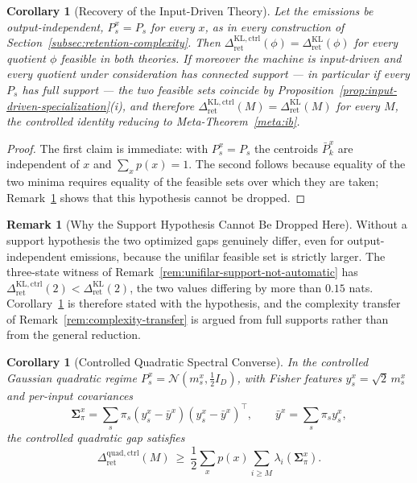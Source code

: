 \documentclass[12pt]{article}
\newtheorem{corollary}[theorem]{Corollary}
\theoremstyle{definition}
\newtheorem{remark}[theorem]{Remark}
\newcommand{\RetKL}{\Delta_{\mathrm{ret}}^{\mathrm{KL}}}
\newcommand{\RetKLc}{\Delta_{\mathrm{ret}}^{\mathrm{KL,ctrl}}}
\newcommand{\RetQuadc}{\Delta_{\mathrm{ret}}^{\mathrm{quad,ctrl}}}
\begin{document}
\begin{corollary}[Recovery of the Input-Driven Theory]
\label{cor:controlled-reduces}
Let the emissions be output-independent, $P_s^x=P_s$ for every $x$, as in every
construction of Section~\ref{subsec:retention-complexity}.  Then
$\RetKLc(\phi)=\RetKL(\phi)$ for every quotient $\phi$ feasible
in both theories.  If moreover the machine is input-driven and every quotient
under consideration has connected support --- in particular if every $P_s$ has
full support --- the two feasible sets coincide by
Proposition~\ref{prop:input-driven-specialization}(i), and therefore
$\RetKLc(M)=\RetKL(M)$ for every $M$, the controlled identity
reducing to Meta-Theorem~\ref{meta:ib}.
\end{corollary}

\begin{proof}
The first claim is immediate: with $P_s^x=P_s$ the centroids $\bar P_k^x$ are
independent of $x$ and $\sum_xp(x)=1$.  The second follows because equality of
the two minima requires equality of the feasible sets over which they are
taken; Remark~\ref{rem:controlled-reduces-sharp} shows that this hypothesis
cannot be dropped.
\end{proof}

\begin{remark}[Why the Support Hypothesis Cannot Be Dropped Here]
\label{rem:controlled-reduces-sharp}
Without a support hypothesis the two optimized gaps genuinely differ, even for
output-independent emissions, because the unifilar feasible set is strictly
larger.  The three-state witness of
Remark~\ref{rem:unifilar-support-not-automatic} has
$\RetKLc(2)<\RetKL(2)$, the two values differing by more than
$0.15$ nats.  Corollary~\ref{cor:controlled-reduces} is therefore stated with
the hypothesis, and the complexity transfer of
Remark~\ref{rem:complexity-transfer} is argued from full supports rather than
from the general reduction.
\end{remark}

\begin{corollary}[Controlled Quadratic Spectral Converse]
\label{cor:controlled-quad-spectral}
In the controlled Gaussian quadratic regime $P_s^x=\mathcal N(m_s^x,\tfrac12I_D)$,
with Fisher features $y_s^x=\sqrt2\,m_s^x$ and per-input covariances
\[
\bm{\Sigma}_\pi^x=\sum_s\pi_s(y_s^x-\bar y^x)(y_s^x-\bar y^x)^{\!\top},
\qquad
\bar y^x=\sum_s\pi_sy_s^x,
\]
the controlled quadratic gap satisfies
\[
\RetQuadc(M)
\ \ge\
\frac12\sum_xp(x)\sum_{i\ge M}\lambda_i(\bm{\Sigma}_\pi^x).
\]
\end{corollary}
\end{document}
